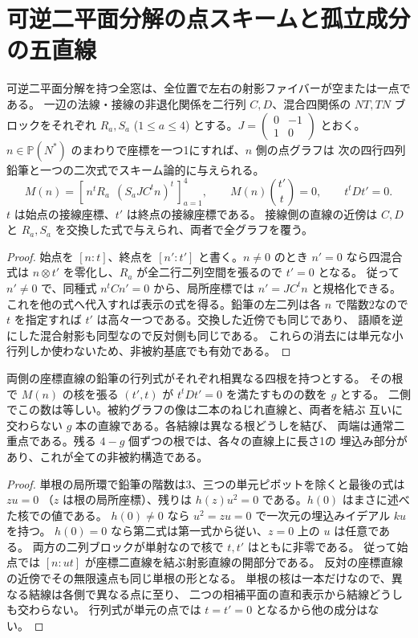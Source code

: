 \section{可逆二平面分解の点スキームと孤立成分の五直線}
\label{sec:split-point-pencils}
\begin{theorem}\label{thm:split-point-pencils}
可逆二平面分解を持つ全窓は、全位置で左右の射影ファイバーが空または一点である。
一辺の法線・接線の非退化関係を二行列 $C,D$、混合四関係の $NT,TN$ ブロックをそれぞれ
$R_a,S_a$ ($1\le a\le4$) とする。$J=\left(\begin{smallmatrix}0&-1\\1&0\end{smallmatrix}\right)$ とおく。
$n\in\mathbb P(N^*)$ のまわりで座標を一つ1にすれば、$n$ 側の点グラフは
次の四行四列鉛筆と一つの二次式でスキーム論的に与えられる。
\[
 M(n)=\left[\,n^tR_a\ \ (S_a JC^t n)^t\,\right]_{a=1}^4,\qquad
 M(n)\binom{t'}t=0,\qquad t^t D t'=0 .
\]
$t$ は始点の接線座標、$t'$ は終点の接線座標である。
接線側の直線の近傍は $C,D$ と $R_a,S_a$ を交換した式で与えられ、両者で全グラフを覆う。
\end{theorem}
\begin{proof}
始点を $[n:t]$、終点を $[n':t']$ と書く。$n\ne0$ のとき $n'=0$ なら四混合式は
$n\otimes t'$ を零化し、$R_a$ が全二行二列空間を張るので $t'=0$ となる。
従って $n'\ne0$ で、同種式 $n^t Cn'=0$ から、局所座標では $n'=JC^tn$ と規格化できる。
これを他の式へ代入すれば表示の式を得る。鉛筆の左二列は各 $n$ で階数2なので
$t$ を指定すれば $t'$ は高々一つである。交換した近傍でも同じであり、
語順を逆にした混合射影も同型なので反対側も同じである。
これらの消去には単元な小行列しか使わないため、非被約基底でも有効である。
\end{proof}

\begin{proposition}\label{prop:split-simple-four-roots}
両側の座標直線の鉛筆の行列式がそれぞれ相異なる四根を持つとする。
その根で $M(n)$ の核を張る $(t',t)$ が $t^tDt'=0$ を満たすものの数を $g$ とする。
二側でこの数は等しい。被約グラフの像は二本のねじれ直線と、両者を結ぶ
互いに交わらない $g$ 本の直線である。各結線は異なる根どうしを結び、
両端は通常二重点である。残る $4-g$ 個ずつの根では、各々の直線上に長さ1の
埋込み部分があり、これが全ての非被約構造である。
\end{proposition}
\begin{proof}
単根の局所環で鉛筆の階数は3、三つの単元ピボットを除くと最後の式は $zu=0$
（$z$ は根の局所座標）、残りは $h(z)u^2=0$ である。$h(0)$ はまさに述べた核での値である。
$h(0)\ne0$ なら $u^2=zu=0$ で一次元の埋込みイデアル $ku$ を持つ。
$h(0)=0$ なら第二式は第一式から従い、$z=0$ 上の $u$ は任意である。
両方の二列ブロックが単射なので核で $t,t'$ はともに非零である。
従って始点では $[n:ut]$ が座標二直線を結ぶ射影直線の開部分である。
反対の座標直線の近傍でその無限遠点も同じ単根の形となる。
単根の核は一本だけなので、異なる結線は各側で異なる点に至り、
二つの相補平面の直和表示から結線どうしも交わらない。
行列式が単元の点では $t=t'=0$ となるから他の成分はない。
\end{proof}

